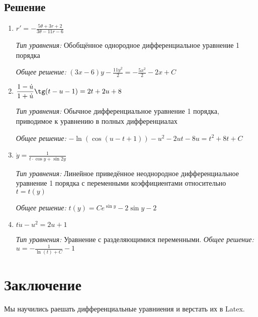 \documentclass[14pt, a4paper, titlepage, fleqn]{extarticle}
\begin{document}
        \subsection{Решение}
            \begin{enumerate}
                \item 
                \(
                    \displaystyle
                    r' = -\frac{5\theta + 3r + 2}{3\theta -11r-6}    
                \)

                \textit{Тип уравнения:}
                Обобщённое однородное дифференциальное уравнение 1 порядка

                \textit{Общее решение:}
                \(
                    \displaystyle
                    (3x-6)y-\frac{11y^2}{2}=-\frac{5x^2}{2}-2x+C
                \)

                \item 
                \(
                    \displaystyle
                    \frac{1-\dot{u}}{1+\dot{u}} \tg (t-u-1) = 2t+2u+8
                \)

                \textit{Тип уравнения:}
                Обычное дифференциальное уравнение 1 порядка, приводимое к
                уравнению в полных дифференциалах

                \textit{Общее решение:}
                \(
                    \displaystyle
                    -\ln{(\cos{(u-t+1)})}-u^2-2ut-8u=t^2+8t+C
                \)

                \item 
                \(
                    \displaystyle
                    \dot{y} = \frac{1}{t \cdot \cos{y} + \sin{2y}}
                \)

                \textit{Тип уравнения:}
                Линейное приведённое неоднородное дифференциальное уравнение 
                1 порядка с переменными коэффициентами относительно \(t = t(y)\)

                \textit{Общее решение:}
                \(
                    \displaystyle
                    t(y) = C e^{\sin{y}} - 2 \sin{y}-2
                \)
                
                \item 
                \(
                    \displaystyle
                    t\dot{u} - u^2=2u+1    
                \)

                \textit{Тип уравнения:} Уравнение с разделяющимися переменными.
                \textit{Общее решение:}
                \(
                    \displaystyle
                    u = -\frac{1}{\ln(t) + C} - 1
                \)
            \end{enumerate}

    \pagebreak

    \section{Заключение}
        Мы научились раешать дифференциальные
        уравниения и верстать их в Latex.
\end{document}
